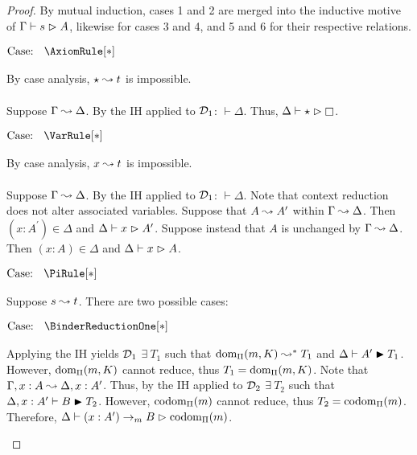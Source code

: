 \begin{proof}
    By mutual induction, cases 1 and 2 are merged into the inductive motive of $\Gamma \vdash s \vartriangleright A$, likewise for cases 3 and 4, and 5 and 6 for their respective relations.

    $\text{Case: }\begin{array}{c} \AxiomRule[*] \end{array}$
    \begin{proofcase}
        By case analysis, $\star \leadsto t$ is impossible.
        \\ \\
        Suppose $\Gamma \leadsto \Delta$.
        By the IH applied to $\mathcal{D}_{1}$: $\vdash \Delta$.
        Thus, $\Delta \vdash \star \infr \kind$.
    \end{proofcase}

    $\text{Case: }\begin{array}{c} \VarRule[*] \end{array}$
    \begin{proofcase}
        By case analysis, $x \leadsto t$ is impossible.
        \\ \\
        Suppose $\Gamma \leadsto \Delta$.
        By the IH applied to $\mathcal{D}_{1}$: $\vdash \Delta$.
        Note that context reduction does not alter associated variables.
        Suppose that $A \leadsto A^\prime$ within $\Gamma \leadsto \Delta$.
        Then $(x : A^\prime) \in \Delta$ and $\Delta \vdash x \vartriangleright A^\prime$.
        Suppose instead that $A$ is unchanged by $\Gamma \leadsto \Delta$.
        Then $(x : A) \in \Delta$ and $\Delta \vdash x \vartriangleright A$.
    \end{proofcase}

    $\text{Case: }\begin{array}{c} \PiRule[*] \end{array}$
    \begin{proofcase}
        Suppose $s \leadsto t$.
        There are two possible cases:

        $\text{Case: }\begin{array}{c} \BinderReductionOne[*] \end{array}$
        \begin{proofcase}
            Applying the IH yields $\mathcal{D}_{1}$ $\exists\ T_1$ such that $\mbox{\normalfont dom}_\Pi(m, K) \leadsto^* T_1$ and $\Delta \vdash A^\prime \blacktriangleright T_1$.
            However, $\mbox{\normalfont dom}_\Pi(m,K)$ cannot reduce, thus $T_1 = \mbox{\normalfont dom}_\Pi(m,K)$.
            Note that $\Gamma, x : A \leadsto \Delta, x : A^\prime$.
            Thus, by the IH applied to $\mathcal{D}_{2}$ $\exists\ T_2$ such that $\Delta, x : A^\prime \vdash B \blacktriangleright T_2$.
            However, $\mbox{\normalfont codom}_\Pi(m)$ cannot reduce, thus $T_2 = \mbox{\normalfont codom}_\Pi(m)$.
            Therefore, $\Delta \vdash (x : A^\prime) \to_m B \vartriangleright \mbox{\normalfont codom}_\Pi(m)$.
        \end{proofcase}


\end{proofcase}
\end{proof}
